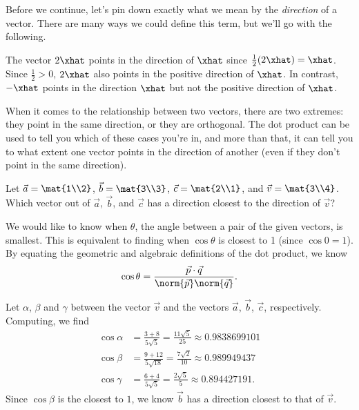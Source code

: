 \medskip
Before we continue, let's pin down exactly what we mean by
the \emph{direction} of a vector.  
There are many ways we could define
this term, but we'll go with the following.


The vector $2\xhat$ points in the direction of $\xhat$ since
$\frac{1}{2}(2\xhat)=\xhat$.  Since $\frac{1}{2}>0$, $2\xhat$ also points
in the positive direction of $\xhat$. In contrast, 
$-\xhat$ points in the direction $\xhat$ but not the positive direction of $\xhat$.

When it comes to the relationship between two vectors, there are two extremes: they
point in the same direction, or they are orthogonal. The dot product can be used to
tell you which of these cases you're in, and more than that, it can tell you to 
what extent one vector points in the direction of another (even if they don't point in
the same direction).

\begin{example}
	Let $\vec a=\mat{1\\2}$, $\vec b=\mat{3\\3}$, $\vec c=\mat{2\\1}$, and $\vec v=\mat{3\\4}$. Which vector out of
	$\vec a$, $\vec b$, and $\vec c$ has a direction closest to the direction of $\vec v$?
    
	We would like to know when $\theta$, the angle between a pair of the given vectors, is smallest.
	This is equivalent to finding when $\cos\theta$ is closest to 1 (since $\cos0=1$).
    	By equating the geometric and algebraic definitions of the dot product, we know
	    \[
        	\cos\theta = \frac{\vec p\cdot\vec q}{\norm{\vec p}\norm{\vec q}}.
	    \]
    
    Let $\alpha$, $\beta$ and $\gamma$ between the vector $\vec v$ and
	the vectors $\vec a$, $\vec b$, $\vec c$, respectively. Computing, we find
	\begin{align*}
	    \cos \alpha &= \frac{3+8}{5\sqrt{5}}=\frac{11\sqrt{5}}{25} \approx 0.9838699101 \\
		\cos \beta &= \frac{9+12}{5\sqrt{18}} =\frac{7\sqrt{2}}{10} \approx 0.989949437\\
	    \cos \gamma &= \frac{6+4}{5\sqrt{5}}=\frac{2\sqrt{5}}{5} \approx 0.894427191. 
	\end{align*}
	Since $\cos \beta$ is the closest to $1$, we know $\vec b$ has a direction closest to that of $\vec v$.
\end{example}


